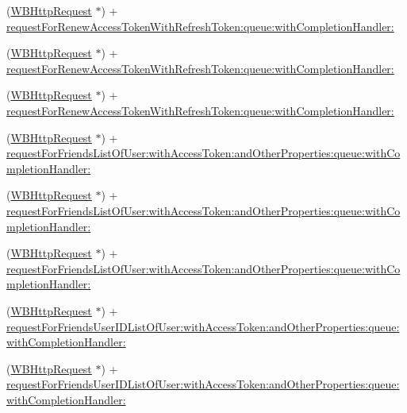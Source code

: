 \begin{DoxyCompactItemize}
\item 
(\mbox{\hyperlink{interface_w_b_http_request}{W\+B\+Http\+Request}} $\ast$) + \mbox{\hyperlink{interface_w_b_http_request_a64ee3aba6d2b2251083753cef8ad4002}{request\+For\+Renew\+Access\+Token\+With\+Refresh\+Token\+:queue\+:with\+Completion\+Handler\+:}}
\item 
(\mbox{\hyperlink{interface_w_b_http_request}{W\+B\+Http\+Request}} $\ast$) + \mbox{\hyperlink{interface_w_b_http_request_a64ee3aba6d2b2251083753cef8ad4002}{request\+For\+Renew\+Access\+Token\+With\+Refresh\+Token\+:queue\+:with\+Completion\+Handler\+:}}
\item 
(\mbox{\hyperlink{interface_w_b_http_request}{W\+B\+Http\+Request}} $\ast$) + \mbox{\hyperlink{interface_w_b_http_request_a64ee3aba6d2b2251083753cef8ad4002}{request\+For\+Renew\+Access\+Token\+With\+Refresh\+Token\+:queue\+:with\+Completion\+Handler\+:}}
\item 
(\mbox{\hyperlink{interface_w_b_http_request}{W\+B\+Http\+Request}} $\ast$) + \mbox{\hyperlink{interface_w_b_http_request_a6bec26ae942e00b30352846353c10f4d}{request\+For\+Friends\+List\+Of\+User\+:with\+Access\+Token\+:and\+Other\+Properties\+:queue\+:with\+Completion\+Handler\+:}}
\item 
(\mbox{\hyperlink{interface_w_b_http_request}{W\+B\+Http\+Request}} $\ast$) + \mbox{\hyperlink{interface_w_b_http_request_a6bec26ae942e00b30352846353c10f4d}{request\+For\+Friends\+List\+Of\+User\+:with\+Access\+Token\+:and\+Other\+Properties\+:queue\+:with\+Completion\+Handler\+:}}
\item 
(\mbox{\hyperlink{interface_w_b_http_request}{W\+B\+Http\+Request}} $\ast$) + \mbox{\hyperlink{interface_w_b_http_request_a6bec26ae942e00b30352846353c10f4d}{request\+For\+Friends\+List\+Of\+User\+:with\+Access\+Token\+:and\+Other\+Properties\+:queue\+:with\+Completion\+Handler\+:}}
\item 
(\mbox{\hyperlink{interface_w_b_http_request}{W\+B\+Http\+Request}} $\ast$) + \mbox{\hyperlink{interface_w_b_http_request_a388ba16ea6e89e121893833f2a7d7b86}{request\+For\+Friends\+User\+I\+D\+List\+Of\+User\+:with\+Access\+Token\+:and\+Other\+Properties\+:queue\+:with\+Completion\+Handler\+:}}
\item 
(\mbox{\hyperlink{interface_w_b_http_request}{W\+B\+Http\+Request}} $\ast$) + \mbox{\hyperlink{interface_w_b_http_request_a388ba16ea6e89e121893833f2a7d7b86}{request\+For\+Friends\+User\+I\+D\+List\+Of\+User\+:with\+Access\+Token\+:and\+Other\+Properties\+:queue\+:with\+Completion\+Handler\+:}}
\item 

\end{DoxyCompactItemize}
